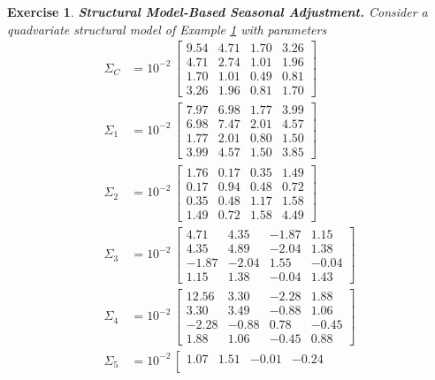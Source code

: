 \documentclass[a4paper]{book}
\newtheorem{Exercise}{Exercise}
\begin{document}
\begin{Exercise} {\bf Structural Model-Based Seasonal Adjustment.} \rm
\label{exer:sa}
 Consider a quadvariate structural model of Example \ref{exer:sa} with parameters 
\begin{align*}
 \Sigma_C & = 10^{-2} \, \left[ \begin{array}{llll} 
  9.54 & 4.71 & 1.70 &  3.26  \\
  4.71 & 2.74 & 1.01 & 1.96  \\
  1.70 & 1.01 & 0.49 & 0.81 \\
  3.26 & 1.96 & 0.81 &  1.70  \end{array} \right] \\
  \Sigma_1 & = 10^{-2} \, \left[ \begin{array}{llll} 
 7.97 & 6.98 & 1.77 & 3.99 \\
 6.98 & 7.47 & 2.01 & 4.57 \\
 1.77 & 2.01 & 0.80 & 1.50 \\
 3.99 & 4.57 & 1.50 & 3.85 \end{array} \right] \\
   \Sigma_2 & = 10^{-2} \, \left[ \begin{array}{llll} 
 1.76 & 0.17 & 0.35 & 1.49 \\
 0.17 & 0.94 & 0.48 & 0.72 \\
 0.35 & 0.48 & 1.17 & 1.58 \\
 1.49 & 0.72 & 1.58 & 4.49 \end{array} \right] \\
    \Sigma_3 & = 10^{-2} \, \left[ \begin{array}{llll} 
  4.71 &  4.35 & -1.87 &  1.15 \\
  4.35 &  4.89 & -2.04 &  1.38 \\
 -1.87 & -2.04 &  1.55 & -0.04 \\
  1.15 &  1.38 & -0.04 &  1.43 \end{array} \right] \\
    \Sigma_4 & = 10^{-2} \, \left[ \begin{array}{llll} 
 12.56 &  3.30 & -2.28  & 1.88 \\
  3.30 &  3.49 & -0.88 &  1.06 \\
 -2.28 & -0.88 &  0.78 & -0.45 \\
  1.88 &  1.06 & -0.45 &  0.88 \end{array} \right] \\
     \Sigma_5 & = 10^{-2} \, \left[ \begin{array}{llll} 
 1.07 & 1.51 & -0.01 & -0.24  \\

\end{array}
\end{align*}
\end{Exercise}
\end{document}
